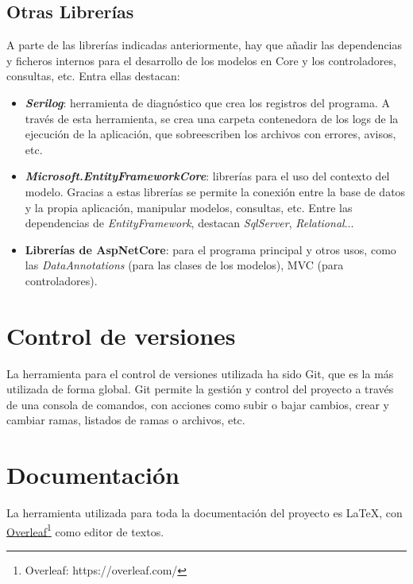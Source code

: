 \subsection{Otras Librerías}
A parte de las librerías indicadas anteriormente, hay que añadir las dependencias y ficheros internos para el desarrollo de los modelos en Core y los controladores, consultas, etc.
Entra ellas destacan:
\begin{itemize}
 \item \textbf{\emph{Serilog}}: herramienta de diagnóstico que crea los registros del programa. A través de esta herramienta, se crea una carpeta contenedora de los logs de la ejecución de la aplicación, que sobreescriben los archivos con errores, avisos, etc.
 \item \textbf{\emph{Microsoft.EntityFrameworkCore}}: librerías para el uso del contexto del modelo. Gracias a estas librerías se permite la conexión entre la base de datos y la propia aplicación, manipular modelos, consultas, etc. Entre las dependencias de \emph{EntityFramework}, destacan \emph{SqlServer}, \emph{Relational}...
 \item \textbf{Librerías de AspNetCore}: para el programa principal y otros usos, como las \emph{DataAnnotations} (para las clases de los modelos), MVC (para controladores). 
\end{itemize}

\section{Control de versiones}
La herramienta para el control de versiones utilizada ha sido Git, que es la más utilizada de forma global. Git permite la gestión y control del proyecto a través de una consola de comandos, con acciones como subir o bajar cambios, crear y cambiar ramas, listados de ramas o archivos, etc.

\section{Documentación}
La herramienta utilizada para toda la documentación del proyecto es LaTeX, con \href{https://overleaf.com/}{Overleaf}\footnote{Overleaf: https://overleaf.com/} como editor de textos.

